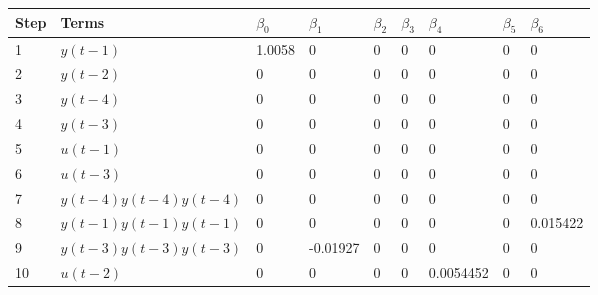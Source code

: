 \begin{tabular}{lllllllll}
Step & Terms & $\beta_{0}$ & $\beta_{1}$ & $\beta_{2}$ & $\beta_{3}$ & $\beta_{4}$ & $\beta_{5}$ & $\beta_{6}$ \\ 
\hline 
1 & $y(t-1)$ & 1.0058 & 0 & 0 & 0 & 0 & 0 & 0 \\ 
2 & $y(t-2)$ & 0 & 0 & 0 & 0 & 0 & 0 & 0 \\ 
3 & $y(t-4)$ & 0 & 0 & 0 & 0 & 0 & 0 & 0 \\ 
4 & $y(t-3)$ & 0 & 0 & 0 & 0 & 0 & 0 & 0 \\ 
5 & $u(t-1)$ & 0 & 0 & 0 & 0 & 0 & 0 & 0 \\ 
6 & $u(t-3)$ & 0 & 0 & 0 & 0 & 0 & 0 & 0 \\ 
7 & $y(t-4)y(t-4)y(t-4)$ & 0 & 0 & 0 & 0 & 0 & 0 & 0 \\ 
8 & $y(t-1)y(t-1)y(t-1)$ & 0 & 0 & 0 & 0 & 0 & 0 & 0.015422 \\ 
9 & $y(t-3)y(t-3)y(t-3)$ & 0 & -0.01927 & 0 & 0 & 0 & 0 & 0 \\ 
10 & $u(t-2)$ & 0 & 0 & 0 & 0 & 0.0054452 & 0 & 0 \\ 
\hline 
\end{tabular}